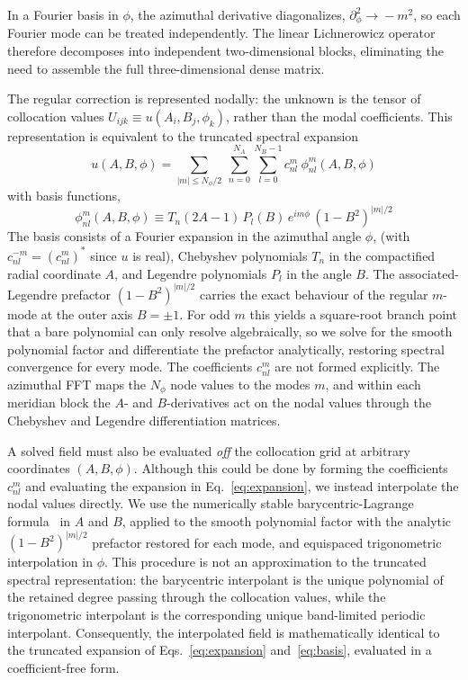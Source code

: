 \documentclass[
  aps,
  prd,
  twocolumn,
  amsmath,
  amssymb,
  nofootinbib,
  superscriptaddress,
  floatfix,
]{revtex4-2}
\begin{document}
In a Fourier basis in $\phi$, the azimuthal derivative diagonalizes, $\partial_\phi^2\!\rightarrow\!-m^2$, so each Fourier mode can be treated independently.
The linear Lichnerowicz operator therefore decomposes into independent two-dimensional blocks, eliminating the need to assemble the full three-dimensional dense matrix.


The regular correction is represented nodally: the unknown is the tensor of collocation values $U_{ijk}\equiv u(A_i,B_j,\phi_k)$, rather than the modal coefficients.
This representation is equivalent to the truncated spectral expansion
\begin{equation}
  u(A,B,\phi) = \!\!\sum_{|m|\le N_\phi/2} \ \sum_{n=0}^{N_A}\sum_{l=0}^{N_B-1} c^{m}_{nl} \ \phi_{nl}^{m}(A,B,\phi) \label{eq:expansion}
\end{equation}
with basis functions,
\begin{equation}
  \phi_{nl}^{m}(A,B,\phi) \equiv T_n(2A-1)\,P_l(B) \, e^{im\phi}\,(1-B^2)^{|m|/2}
  \label{eq:basis}
\end{equation}
The basis consists of a Fourier expansion in the azimuthal angle $\phi$, (with $c^{-m}_{nl}=(c^{m}_{nl})^{*}$ since
$u$ is real), Chebyshev polynomials $T_n$ in the compactified radial coordinate
$A$, and Legendre polynomials $P_l$ in the angle $B$. The associated-Legendre
prefactor $(1-B^2)^{|m|/2}$ carries the exact behaviour of the regular $m$-mode at
the outer axis $B=\pm1$. For odd $m$ this yields a square-root branch point that a bare
polynomial can only resolve algebraically, so we solve for the smooth polynomial
factor and differentiate the prefactor analytically, restoring spectral
convergence for every mode. 
The coefficients $c_{nl}^m$ are not formed explicitly.
The azimuthal FFT maps the $N_\phi$ node values to the modes $m$, and within each meridian block the $A$- and $B$-derivatives act on the nodal values through the Chebyshev and Legendre differentiation matrices.

A solved field must also be evaluated \emph{off} the collocation grid at
arbitrary coordinates $(A,B,\phi)$. Although this could be done by forming the
coefficients $c^{m}_{nl}$ and evaluating the expansion in
Eq.~\eqref{eq:expansion}, we instead interpolate the nodal values directly. We
use the numerically stable barycentric-Lagrange
formula~\cite{Trefethen2019} in $A$ and $B$, applied to the smooth polynomial
factor with the analytic $(1-B^2)^{|m|/2}$ prefactor restored for each mode, and
equispaced trigonometric interpolation in $\phi$. This procedure is not an
approximation to the truncated spectral representation: the barycentric
interpolant is the unique polynomial of the retained degree passing through the
collocation values, while the trigonometric interpolant is the corresponding
unique band-limited periodic interpolant. Consequently, the interpolated field
is mathematically identical to the truncated expansion of
Eqs.~\eqref{eq:expansion} and~\eqref{eq:basis}, evaluated in a
coefficient-free form.
\end{document}
